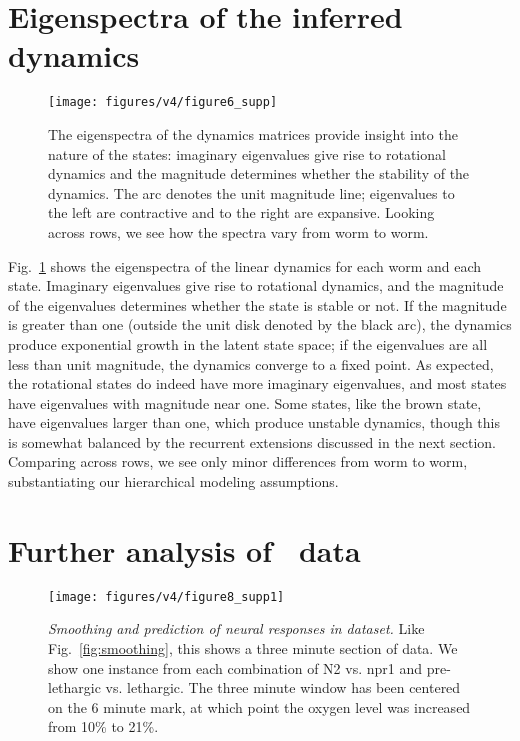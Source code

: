 \documentclass[11pt]{article}
\begin{document}
\clearpage

\section{Eigenspectra of the inferred dynamics}
\begin{figure}[t!]
\centering%
\texttt{[image: figures/v4/figure6\_supp]} 
\caption{The eigenspectra of the dynamics matrices
    provide insight into the nature of the states: imaginary eigenvalues
    give rise to rotational dynamics and the magnitude determines
    whether the stability of the dynamics. The arc denotes
    the unit magnitude line; eigenvalues to the left are contractive
    and to the right are expansive. Looking across rows, we
    see how the spectra vary from worm to worm. 
}
\label{fig:eigen}
\end{figure}

Fig.~\ref{fig:eigen} shows the eigenspectra of the linear
dynamics for each worm and each state.  Imaginary eigenvalues give
rise to rotational dynamics, and the magnitude of the eigenvalues
determines whether the state is stable or not.  If the magnitude is
greater than one (outside the unit disk denoted by the black arc),
the dynamics produce exponential growth in the latent state space; if
the eigenvalues are all less than unit magnitude, the dynamics converge
to a fixed point.  As expected, the rotational states do indeed have
more imaginary eigenvalues, and most states have eigenvalues with
magnitude near one.  Some states, like the brown state, have eigenvalues
larger than one, which produce unstable dynamics, though this is
somewhat balanced by the recurrent extensions discussed in the next
section.  Comparing across rows, we see only minor differences from worm
to worm, substantiating our hierarchical modeling assumptions.

\clearpage

\section{Further analysis of~\citet{nichols2017global} data}

\begin{figure}[t!]
\centering%
\texttt{[image: figures/v4/figure8\_supp1]} 
\caption{\textit{Smoothing and prediction of neural responses
    in \citet{nichols2017global} dataset.} Like Fig.~\ref{fig:smoothing},
  this shows a three minute section of data.  We show one instance
  from each combination of N2 vs. npr1 and pre-lethargic vs. lethargic.
  The three minute window has been centered on the 6 minute mark, at
  which point the oxygen level was increased from 10\% to 21\%.  }
\label{fig:nichols_supp1}
\end{figure}
\end{document}
